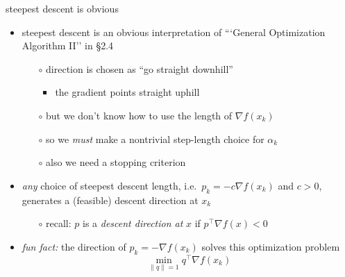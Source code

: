 \documentclass[10pt,hyperref]{beamer}
\newcommand{\grad}{\nabla}
\begin{document}
\begin{frame}{steepest descent is obvious}

\begin{itemize}
\item steepest descent is an obvious interpretation of ```General Optimization Algorithm II'' in \S 2.4
    \begin{itemize}
    \item[$\circ$] direction is chosen as ``go straight downhill''
        \begin{itemize}
        \item the gradient points straight uphill
        \end{itemize}
    \item[$\circ$] \alert{but we don't know how to use the length of $\grad f(x_k)$}
    \item[$\circ$] so we \emph{must} make a nontrivial step-length choice for $\alpha_k$
    \item[$\circ$] also we need a stopping criterion
    \end{itemize}

\medskip
\item \emph{any} choice of steepest descent length, i.e.~$p_k = - c \grad f(x_k)$ and $c>0$, generates a (feasible) descent direction at $x_k$
    \begin{itemize}
    \item[$\circ$] recall: $p$ is a \emph{descent direction at} $x$ if $p^\top \grad f(x)<0$
    \end{itemize}

\medskip
\item \emph{fun fact:} the direction of $p_k = - \grad f(x_k)$ solves this optimization problem
    $$\min_{\|q\|=1} q^\top \grad f(x_k)$$
\end{itemize}
\end{frame}
\end{document}
